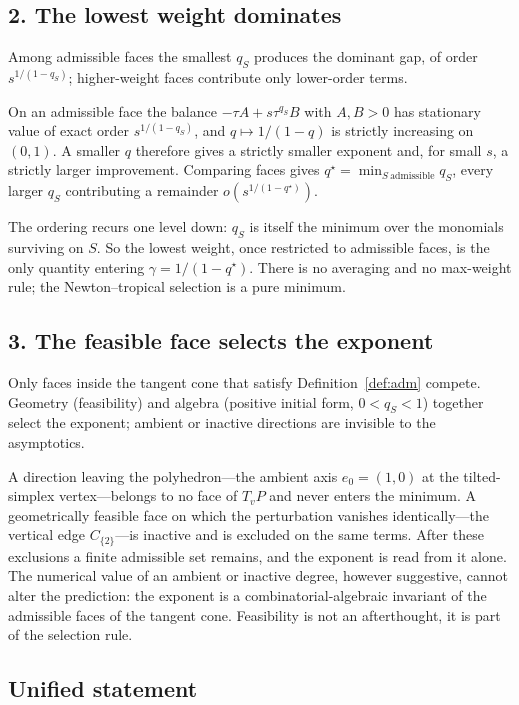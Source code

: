 \documentclass[11pt]{article}
\theoremstyle{definition}
\theoremstyle{remark}
\begin{document}
\subsection*{2. The lowest weight dominates}

Among admissible faces the smallest $q_S$ produces the dominant gap, of order
$s^{1/(1-q_S)}$; higher-weight faces contribute only lower-order terms.

On an admissible face the balance $-\tau A+s\tau^{q_S}B$ with $A,B>0$ has
stationary value of exact order $s^{1/(1-q_S)}$, and $q\mapsto1/(1-q)$ is
strictly increasing on $(0,1)$. A smaller $q$ therefore gives a strictly
smaller exponent and, for small $s$, a strictly larger improvement. Comparing
faces gives $q^\star=\min_{S\ \mathrm{admissible}}q_S$, every larger $q_S$
contributing a remainder $o(s^{1/(1-q^\star)})$.

The ordering recurs one level down: $q_S$ is itself the minimum over the
monomials surviving on $S$. So the lowest weight, once restricted to
admissible faces, is the only quantity entering $\gamma=1/(1-q^\star)$. There
is no averaging and no max-weight rule; the Newton--tropical selection is a
pure minimum.

\subsection*{3. The feasible face selects the exponent}

Only faces inside the tangent cone that satisfy Definition~\ref{def:adm}
compete. Geometry (feasibility) and algebra (positive initial form,
$0<q_S<1$) together select the exponent; ambient or inactive directions are
invisible to the asymptotics.

A direction leaving the polyhedron---the ambient axis $e_0=(1,0)$ at the
tilted-simplex vertex---belongs to no face of $T_vP$ and never enters the
minimum. A geometrically feasible face on which the perturbation vanishes
identically---the vertical edge $C_{\{2\}}$---is inactive and is excluded on
the same terms. After these exclusions a finite admissible set remains, and
the exponent is read from it alone. The numerical value of an ambient or
inactive degree, however suggestive, cannot alter the prediction: the exponent
is a combinatorial-algebraic invariant of the admissible faces of the tangent
cone. Feasibility is not an afterthought, it is part of the selection rule.

\subsection*{Unified statement}
\end{document}
